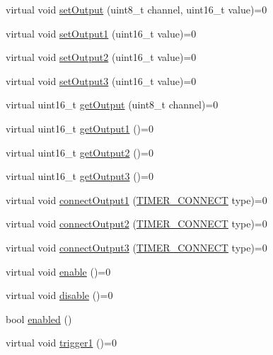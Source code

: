 \begin{DoxyCompactItemize}
virtual void \hyperlink{classmhvlib_1_1_timer_a2bd209afac9d4b4b9157f1ea87c19af6}{set\-Output} (uint8\-\_\-t channel, uint16\-\_\-t value)=0
\item 
virtual void \hyperlink{classmhvlib_1_1_timer_a990dd4fab70b07fe9d29f02c41695cfb}{set\-Output1} (uint16\-\_\-t value)=0
\item 
virtual void \hyperlink{classmhvlib_1_1_timer_a60dbd0974b837a298c84a640ee8180fe}{set\-Output2} (uint16\-\_\-t value)=0
\item 
virtual void \hyperlink{classmhvlib_1_1_timer_a9542259e5ee5db959c8c75e115d0c37a}{set\-Output3} (uint16\-\_\-t value)=0
\item 
virtual uint16\-\_\-t \hyperlink{classmhvlib_1_1_timer_a30c572f5662c6971c634f38450a88ba1}{get\-Output} (uint8\-\_\-t channel)=0
\item 
virtual uint16\-\_\-t \hyperlink{classmhvlib_1_1_timer_aa70ebfcae548be91d84056fd13150e83}{get\-Output1} ()=0
\item 
virtual uint16\-\_\-t \hyperlink{classmhvlib_1_1_timer_a2056f4b6fecc19053eebf59085e4f921}{get\-Output2} ()=0
\item 
virtual uint16\-\_\-t \hyperlink{classmhvlib_1_1_timer_af241c8cb76bcb6d4652d4bbfc7d39875}{get\-Output3} ()=0
\item 
virtual void \hyperlink{classmhvlib_1_1_timer_aeb55cb01edbbf974bcdb46c0065d18a8}{connect\-Output1} (\hyperlink{namespacemhvlib_a670ebf781e5447de855e589e9100e224}{T\-I\-M\-E\-R\-\_\-\-C\-O\-N\-N\-E\-C\-T} type)=0
\item 
virtual void \hyperlink{classmhvlib_1_1_timer_af79ec5fd8d372787aff3a2686ca5d69b}{connect\-Output2} (\hyperlink{namespacemhvlib_a670ebf781e5447de855e589e9100e224}{T\-I\-M\-E\-R\-\_\-\-C\-O\-N\-N\-E\-C\-T} type)=0
\item 
virtual void \hyperlink{classmhvlib_1_1_timer_a5a1e72f2e956fc0ad8e93ab257b7c1ce}{connect\-Output3} (\hyperlink{namespacemhvlib_a670ebf781e5447de855e589e9100e224}{T\-I\-M\-E\-R\-\_\-\-C\-O\-N\-N\-E\-C\-T} type)=0
\item 
virtual void \hyperlink{classmhvlib_1_1_timer_aff85bb710354e6f7ea05852db0882e74}{enable} ()=0
\item 
virtual void \hyperlink{classmhvlib_1_1_timer_a2a512d63703ec0b4b6a03f25122df473}{disable} ()=0
\item 
bool \hyperlink{classmhvlib_1_1_timer_af0fff41cfdc9145d635a9311479a4fb3}{enabled} ()
\item 
virtual void \hyperlink{classmhvlib_1_1_timer_a41cdd9e0f2f4cc0cc87e7117123fb34d}{trigger1} ()=0

\end{DoxyCompactItemize}
